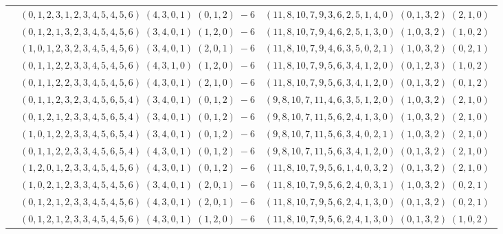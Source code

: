 \documentclass[11pt]{article}
\begin{document}
\begin{longtable}[l]{|c|c|c|}
 \cline{2-3} 
 & $(0 ,1 ,2 ,3 ,1 ,2 ,3 ,4 ,5 ,4 ,5 ,6) \;(4 ,3 ,0 ,1) \;(0 ,1 ,2) \;-6$ & $(11 ,8 ,10 ,7 ,9 ,3 ,6 ,2 ,5 ,1 ,4 ,0) \;(0 ,1 ,3 ,2) \;(2 ,1 ,0) \;$\\ 
 \cline{2-3} 
 & $(0 ,1 ,2 ,1 ,3 ,2 ,3 ,4 ,5 ,4 ,5 ,6) \;(3 ,4 ,0 ,1) \;(1 ,2 ,0) \;-6$ & $(11 ,8 ,10 ,7 ,9 ,4 ,6 ,2 ,5 ,1 ,3 ,0) \;(1 ,0 ,3 ,2) \;(1 ,0 ,2) \;$\\ 
 \cline{2-3} 
 & $(1 ,0 ,1 ,2 ,3 ,2 ,3 ,4 ,5 ,4 ,5 ,6) \;(3 ,4 ,0 ,1) \;(2 ,0 ,1) \;-6$ & $(11 ,8 ,10 ,7 ,9 ,4 ,6 ,3 ,5 ,0 ,2 ,1) \;(1 ,0 ,3 ,2) \;(0 ,2 ,1) \;$\\ 
 \cline{2-3} 
 & $(0 ,1 ,1 ,2 ,2 ,3 ,3 ,4 ,5 ,4 ,5 ,6) \;(4 ,3 ,1 ,0) \;(1 ,2 ,0) \;-6$ & $(11 ,8 ,10 ,7 ,9 ,5 ,6 ,3 ,4 ,1 ,2 ,0) \;(0 ,1 ,2 ,3) \;(1 ,0 ,2) \;$\\ 
 \cline{2-3} 
 & $(0 ,1 ,1 ,2 ,2 ,3 ,3 ,4 ,5 ,4 ,5 ,6) \;(4 ,3 ,0 ,1) \;(2 ,1 ,0) \;-6$ & $(11 ,8 ,10 ,7 ,9 ,5 ,6 ,3 ,4 ,1 ,2 ,0) \;(0 ,1 ,3 ,2) \;(0 ,1 ,2) \;$\\ 
 \cline{2-3} 
 & $(0 ,1 ,1 ,2 ,3 ,2 ,3 ,4 ,5 ,6 ,5 ,4) \;(3 ,4 ,0 ,1) \;(0 ,1 ,2) \;-6$ & $(9 ,8 ,10 ,7 ,11 ,4 ,6 ,3 ,5 ,1 ,2 ,0) \;(1 ,0 ,3 ,2) \;(2 ,1 ,0) \;$\\ 
 \cline{2-3} 
 & $(0 ,1 ,2 ,1 ,2 ,3 ,3 ,4 ,5 ,6 ,5 ,4) \;(3 ,4 ,0 ,1) \;(0 ,1 ,2) \;-6$ & $(9 ,8 ,10 ,7 ,11 ,5 ,6 ,2 ,4 ,1 ,3 ,0) \;(1 ,0 ,3 ,2) \;(2 ,1 ,0) \;$\\ 
 \cline{2-3} 
 & $(1 ,0 ,1 ,2 ,2 ,3 ,3 ,4 ,5 ,6 ,5 ,4) \;(3 ,4 ,0 ,1) \;(0 ,1 ,2) \;-6$ & $(9 ,8 ,10 ,7 ,11 ,5 ,6 ,3 ,4 ,0 ,2 ,1) \;(1 ,0 ,3 ,2) \;(2 ,1 ,0) \;$\\ 
 \cline{2-3} 
 & $(0 ,1 ,1 ,2 ,2 ,3 ,3 ,4 ,5 ,6 ,5 ,4) \;(4 ,3 ,0 ,1) \;(0 ,1 ,2) \;-6$ & $(9 ,8 ,10 ,7 ,11 ,5 ,6 ,3 ,4 ,1 ,2 ,0) \;(0 ,1 ,3 ,2) \;(2 ,1 ,0) \;$\\ 
 \cline{2-3} 
 & $(1 ,2 ,0 ,1 ,2 ,3 ,3 ,4 ,5 ,4 ,5 ,6) \;(4 ,3 ,0 ,1) \;(0 ,1 ,2) \;-6$ & $(11 ,8 ,10 ,7 ,9 ,5 ,6 ,1 ,4 ,0 ,3 ,2) \;(0 ,1 ,3 ,2) \;(2 ,1 ,0) \;$\\ 
 \cline{2-3} 
 & $(1 ,0 ,2 ,1 ,2 ,3 ,3 ,4 ,5 ,4 ,5 ,6) \;(3 ,4 ,0 ,1) \;(2 ,0 ,1) \;-6$ & $(11 ,8 ,10 ,7 ,9 ,5 ,6 ,2 ,4 ,0 ,3 ,1) \;(1 ,0 ,3 ,2) \;(0 ,2 ,1) \;$\\ 
 \cline{2-3} 
 & $(0 ,1 ,2 ,1 ,2 ,3 ,3 ,4 ,5 ,4 ,5 ,6) \;(4 ,3 ,0 ,1) \;(2 ,0 ,1) \;-6$ & $(11 ,8 ,10 ,7 ,9 ,5 ,6 ,2 ,4 ,1 ,3 ,0) \;(0 ,1 ,3 ,2) \;(0 ,2 ,1) \;$\\ 
 \cline{2-3} 
 & $(0 ,1 ,2 ,1 ,2 ,3 ,3 ,4 ,5 ,4 ,5 ,6) \;(4 ,3 ,0 ,1) \;(1 ,2 ,0) \;-6$ & $(11 ,8 ,10 ,7 ,9 ,5 ,6 ,2 ,4 ,1 ,3 ,0) \;(0 ,1 ,3 ,2) \;(1 ,0 ,2) \;$\\ 

\end{longtable}
\end{document}
